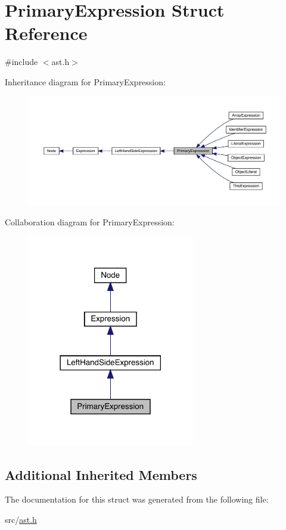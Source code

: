 \hypertarget{struct_primary_expression}{}\section{Primary\+Expression Struct Reference}
\label{struct_primary_expression}


{\ttfamily \#include $<$ast.\+h$>$}



Inheritance diagram for Primary\+Expression\+:
\nopagebreak
\begin{figure}[H]
\begin{center}
\leavevmode
\includegraphics[width=350pt]{struct_primary_expression__inherit__graph}
\end{center}
\end{figure}


Collaboration diagram for Primary\+Expression\+:
\nopagebreak
\begin{figure}[H]
\begin{center}
\leavevmode
\includegraphics[width=206pt]{struct_primary_expression__coll__graph}
\end{center}
\end{figure}
\subsection*{Additional Inherited Members}


The documentation for this struct was generated from the following file\+:\begin{DoxyCompactItemize}
\item 
src/\hyperlink{ast_8h}{ast.\+h}\end{DoxyCompactItemize}
